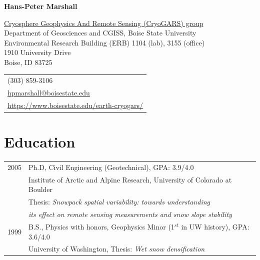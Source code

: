 \documentclass[11pt]{article}
\def\name{Hans-Peter Marshall}
\begin{document}


\centerline{\Large \bf \name}

\vspace{0.25in}

\begin{minipage}{0.70\linewidth}
  \href{http://earth.boisestate.edu/cryogars/}{Cryosphere Geophysics And Remote Sensing (CryoGARS) group} \\
  Department of Geosciences and CGISS, Boise State University \\
  Environmental Research Building (ERB) 1104 (lab), 3155 (office) \\
  1910 University Drive \\
  Boise, ID  83725
\end{minipage}
\begin{minipage}{0.30\linewidth}
  \begin{tabular}{l}
     (303) 859-3106  \\
    \href{mailto:hpmarshall@boisestate.edu}{hpmarshall@boisestate.edu} \\
    \href{https://sites.google.com/boisestate.edu/cryogarswebsite/}{https://www.boisestate.edu/earth-cryogars/} \\
  \end{tabular}
\end{minipage}

\section*{Education}

\begin{tabular}{ll}
	2005 & Ph.D, Civil Engineering (Geotechnical), GPA: 3.9/4.0 \\
	          & Institute of Arctic and Alpine Research, University of Colorado at Boulder \\
		 & Thesis: \textit{Snowpack spatial variability: towards understanding} \\
                  &   \textit{its effect on remote sensing measurements and snow slope stability} \\
	1999 &  B.S., Physics with honors, Geophysics Minor (1$^{st}$ in UW history), GPA: 3.6/4.0 \\
	         &   University of Washington, Thesis: \textit{Wet snow densification} \\
\end{tabular}
\end{document}
